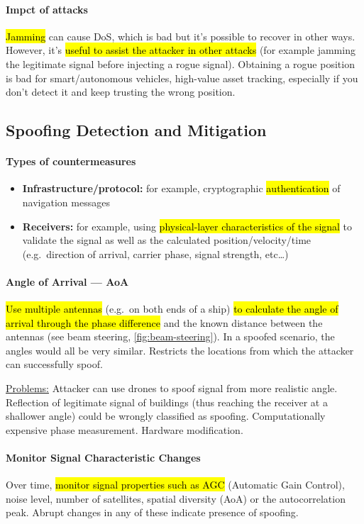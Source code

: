 \paragraph{Impct of attacks}
\hl{Jamming} can cause DoS, which is bad but it's possible to recover in other ways.
However, it's \hl{useful to assist the attacker in other attacks} (for example jamming the
legitimate signal before injecting a rogue signal). Obtaining a rogue position
is bad for smart/autonomous vehicles, high-value asset tracking, especially if
you don't detect it and keep trusting the wrong position.
\subsection{Spoofing Detection and Mitigation}\label{sec:gps-spoof}

\paragraph{Types of countermeasures}
\begin{itemize}
	\item \textbf{Infrastructure/protocol:} for example, cryptographic \hl{authentication} of navigation messages
	\item \textbf{Receivers:} for example, using \hl{physical-layer characteristics of the signal} to validate the signal as well as the calculated position/velocity/time (e.g.\ direction of arrival, carrier phase, signal strength, etc\dots)
\end{itemize}

\paragraph{Angle of Arrival --- AoA}
\hl{Use multiple antennas} (e.g.\ on both ends of a ship) \hl{to calculate the angle of
	arrival through the phase difference} and the known distance between the
antennas (see beam steering, \autoref{fig:beam-steering}). In a spoofed
scenario, the angles would all be very similar. Restricts the locations from
which the attacker can successfully spoof.

\underline{Problems:}
Attacker can use drones to spoof signal from more realistic angle.
Reflection of legitimate signal of buildings (thus reaching the receiver at a shallower angle) could be wrongly classified as spoofing.
Computationally expensive phase measurement.
Hardware modification.

\paragraph{Monitor Signal Characteristic Changes}
Over time, \hl{monitor signal properties such as AGC} (Automatic Gain Control),
noise level, number of satellites, spatial diversity (AoA) or the
autocorrelation peak. Abrupt changes in any of these indicate presence of
spoofing.

